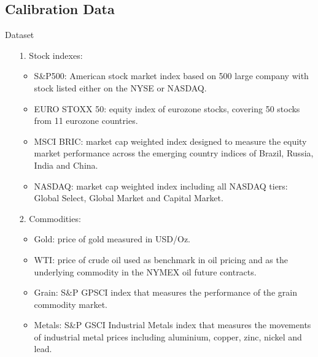\documentclass{beamer}
\begin{document}
\subsection{Calibration Data}

\begin{frame}{Dataset}
\begin{itemize}
\item[1.] Stock indexes:
	\begin{itemize}
		\item S\&P500: American stock market index based on 500 large company with stock listed either on the NYSE or NASDAQ.
		\item EURO STOXX 50: equity index of eurozone stocks, covering 50 stocks from 11 eurozone countries.
		\item MSCI BRIC: market cap weighted index designed to measure the equity market performance across the emerging country indices of Brazil, Russia, India and China.
		\item NASDAQ: market cap weighted index including all NASDAQ tiers: Global Select, Global Market and Capital Market.
	\end{itemize}
\item[2.] Commodities:
	\begin{itemize}
		\item Gold: price of gold measured in USD/Oz.
		\item WTI: price of crude oil used as benchmark in oil pricing and as the underlying commodity in the NYMEX oil future contracts.
		\item Grain: S\&P GPSCI index that measures the performance of the grain commodity market.
		\item Metals: S\&P GSCI Industrial Metals index that measures the movements of industrial metal prices including aluminium, copper, zinc, nickel and lead.
	\end{itemize}
\end{itemize}
\end{frame}
	
\end{document}
